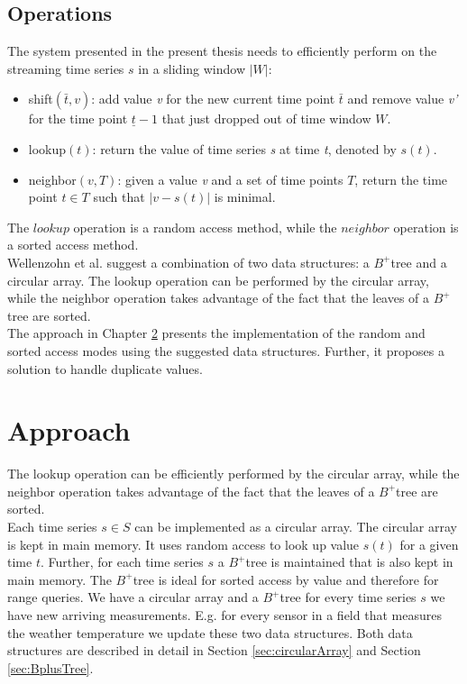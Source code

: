 \documentclass[abstracton,12pt]{scrreprt}
\begin{document}
\section{Operations}
\label{sec:Op}
The system presented in the present thesis needs to efficiently perform on the streaming time series $s$ in a sliding window $|W|$: 
\begin{itemize}  
	\item shift$(\bar{t}, v)$: add value \emph{v} for the new current time point $\bar{t}$ and remove value \emph{v'} for the time point $\underline{t} - 1$ that just dropped out of time window $W$.
	\item lookup$(t)$: return the value of time series \emph{s} at time \emph{t}, denoted by $s(t)$.
	\item neighbor$(v, T)$: given a value \emph{v} and a set of time points $T$, return the time point $t \in T$ such that $|v-s(t)|$ is minimal.
\end{itemize}
The $lookup$ operation is a random access method, while the $neighbor$ operation is a sorted access method.\\
Wellenzohn et al.\cite{BScT} suggest a combination of two data structures: a $B^+$tree and a circular array. The lookup operation can be performed by the circular array, while the neighbor operation takes advantage of the fact that the leaves of a $B^+$tree are sorted.\\
The approach in Chapter \ref{sec:Approach} presents the implementation of the random and sorted access modes using the suggested data structures. Further, it proposes a solution to handle duplicate values. 



\chapter{Approach}
\label{sec:Approach}
The lookup operation can be efficiently performed by the circular array, while the neighbor operation takes advantage of the fact that the leaves of a $B^+$tree are sorted. \\
Each time series $s \in S$ can be implemented as a circular array. The circular array is kept in main memory. It uses random access to look up value $s(t)$ for a given time $t$. Further, for each time series $s$ a $B^+$tree is maintained that is also kept in main memory. The $B^+$tree is ideal for sorted access by value and therefore for range queries. We have a circular array and a $B^+$tree for every time series $s$ we have new arriving measurements. E.g. for every sensor in a field that measures the weather temperature we update these two data structures. Both data structures are described in detail in Section \ref{sec:circularArray} and Section \ref{sec:BplusTree}.
\end{document}
